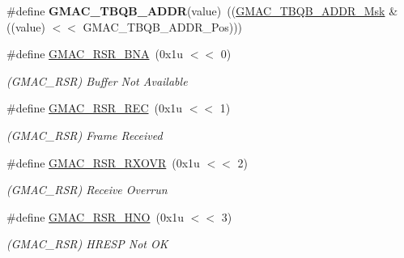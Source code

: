 \begin{DoxyCompactItemize}
\mbox{\label{group__SAMV71__GMAC_ga1cfa7b225e0fa8660b20fe443be3c4cb}} 
\#define {\bfseries G\+M\+A\+C\+\_\+\+T\+B\+Q\+B\+\_\+\+A\+D\+DR}(value)~((\mbox{\hyperlink{group__SAMV71__GMAC_gaf89359a485905c67a16b25227df29edc}{G\+M\+A\+C\+\_\+\+T\+B\+Q\+B\+\_\+\+A\+D\+D\+R\+\_\+\+Msk}} \& ((value) $<$$<$ G\+M\+A\+C\+\_\+\+T\+B\+Q\+B\+\_\+\+A\+D\+D\+R\+\_\+\+Pos)))
\item 
\mbox{\label{group__SAMV71__GMAC_gadb961ee999ad7f99aa8cf186fb1c062e}} 
\#define \mbox{\hyperlink{group__SAMV71__GMAC_gadb961ee999ad7f99aa8cf186fb1c062e}{G\+M\+A\+C\+\_\+\+R\+S\+R\+\_\+\+B\+NA}}~(0x1u $<$$<$ 0)
\begin{DoxyCompactList}\small\item\em (G\+M\+A\+C\+\_\+\+R\+SR) Buffer Not Available \end{DoxyCompactList}\item 
\mbox{\label{group__SAMV71__GMAC_gae73911674a5d00cf3a6cff9c9a03eced}} 
\#define \mbox{\hyperlink{group__SAMV71__GMAC_gae73911674a5d00cf3a6cff9c9a03eced}{G\+M\+A\+C\+\_\+\+R\+S\+R\+\_\+\+R\+EC}}~(0x1u $<$$<$ 1)
\begin{DoxyCompactList}\small\item\em (G\+M\+A\+C\+\_\+\+R\+SR) Frame Received \end{DoxyCompactList}\item 
\mbox{\label{group__SAMV71__GMAC_ga907d41c013b82e8b18111980067b78f0}} 
\#define \mbox{\hyperlink{group__SAMV71__GMAC_ga907d41c013b82e8b18111980067b78f0}{G\+M\+A\+C\+\_\+\+R\+S\+R\+\_\+\+R\+X\+O\+VR}}~(0x1u $<$$<$ 2)
\begin{DoxyCompactList}\small\item\em (G\+M\+A\+C\+\_\+\+R\+SR) Receive Overrun \end{DoxyCompactList}\item 
\mbox{\label{group__SAMV71__GMAC_ga8d2f0d4cf3d127479b34eec4b545f835}} 
\#define \mbox{\hyperlink{group__SAMV71__GMAC_ga8d2f0d4cf3d127479b34eec4b545f835}{G\+M\+A\+C\+\_\+\+R\+S\+R\+\_\+\+H\+NO}}~(0x1u $<$$<$ 3)
\begin{DoxyCompactList}\small\item\em (G\+M\+A\+C\+\_\+\+R\+SR) H\+R\+E\+SP Not OK \end{DoxyCompactList}\item 
$$
\end{DoxyCompactItemize}
